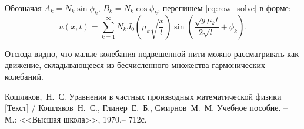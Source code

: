 Обозначая \( A_k = N_k\sin\phi_k \), \( B_k = N_k\cos\phi_k \), перепишем
\eqref{eq:row_solve} в форме:
\begin{equation}
    u(x, t) = \sum\limits_{k = 1}^\infty N_k J_0\left(\mu_k\sqrt{\frac{x}{l}}\right)
    \sin\left(\frac{\sqrt{g}\mu_kt}{2\sqrt{l}} + \phi_k\right).
    \label{eq:final_solve}
\end{equation}

Отсюда видно, что малые колебания подвешенной нити можно рассматривать
как движение, складывающееся из бесчисленного множества гармонических
колебаний.

\newpage
{}
\begin{thebibliography}{9}
    Кошляков,~Н.~С. Уравнения в частных производных
    математической физики [Текст] / Кошляков~Н.~С., Глинер~Е.~Б., Смирнов~М.~М.
    Учебное пособие. -- М.: <<Высшая школа>>, 1970.-- 712с.
\end{thebibliography}
